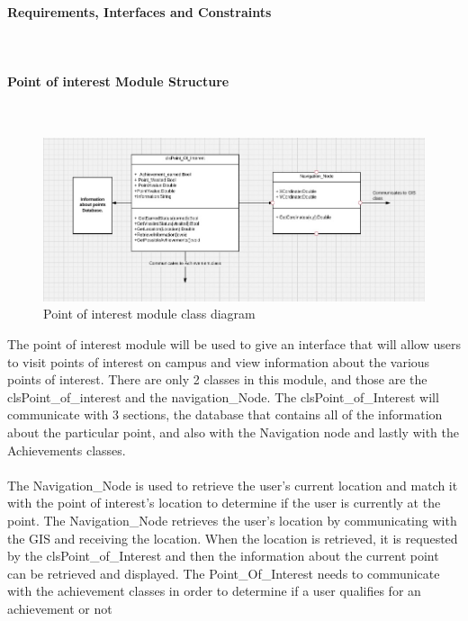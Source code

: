 \documentclass{article}
\begin{document}
				\paragraph {Requirements, Interfaces and Constraints}\mbox{} \\
				\paragraph	{Point of interest Module Structure} \mbox{} \\
			        
	
			        \begin{figure}[h]
			            \includegraphics[width=\textwidth]{./Images/POI_Class.jpg} 
			            \caption{Point of interest module class diagram}
			        \end{figure}

{The point of interest module will be used to give an interface that will allow users to visit points of interest on campus and view information about the various points of interest. There are only 2 classes in this module, and those are the clsPoint\_of\_interest and the navigation\_Node. The clsPoint\_of\_Interest will communicate with 3 sections, the database that contains all of the information about the particular point, and also with the Navigation node and lastly with the Achievements classes.\\ \\ The Navigation\_Node is used to retrieve the user's current location and match it with the point of interest's location to determine if the user is currently at the point. The Navigation\_Node retrieves the user's location by communicating with the GIS and receiving the location. When the location is retrieved, it is requested by the clsPoint\_of\_Interest and then the information about the current point can be retrieved and displayed. The Point\_Of\_Interest needs to communicate with the achievement classes in order to determine if a user qualifies for an achievement or not}
\end{document}
